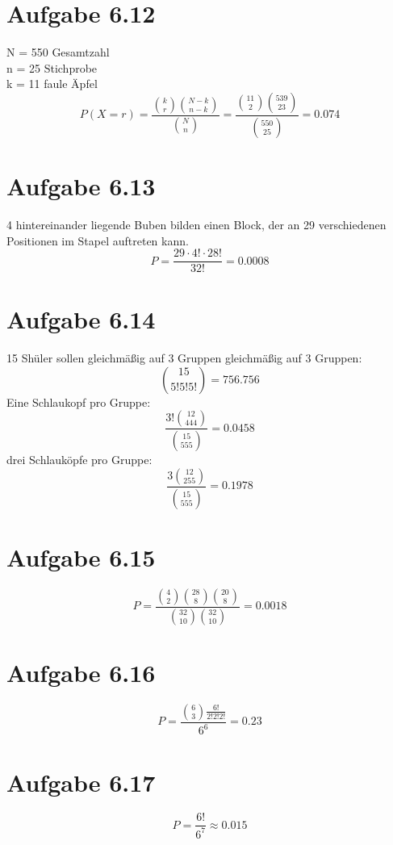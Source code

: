 \documentclass{article}
\begin{document}
	 \section*{Aufgabe 6.12}
	 N = 550 Gesamtzahl \\
	 n = 25 Stichprobe \\
	 k = 11 faule Äpfel \\
	 \newline
	 \[P(X = r) =  \frac{\binom{k}{r}\binom{N - k}{n-k}}{\binom{N}{n}} =  \frac{\binom{11}{2}\binom{539}{23}}{\binom{550}{25}} = 0.074\]
	 
	\section*{Aufgabe 6.13}
	4 hintereinander liegende Buben bilden einen Block, der an 29 verschiedenen Positionen im Stapel auftreten kann. \\
	\[P = \frac{29 \cdot 4! \cdot 28!}{32!} = 0.0008\]
	
	\section*{Aufgabe 6.14}
	15 Shüler sollen gleichmäßig auf 3 Gruppen gleichmäßig auf 3 Gruppen: \\
	 \[\binom{15}{5!5!5!} = 756.756\]
	Eine Schlaukopf pro Gruppe: \\
	\[\frac{3!\binom{12}{4 4 4}}{\binom{15}{5 5 5}} = 0.0458\]
	drei Schlauköpfe pro Gruppe: 
	\[\frac{3\binom{12}{2 5 5}}{\binom{15}{5 5 5}} = 0.1978\]
	
	\section*{Aufgabe 6.15}
	\[P = \frac{\binom{4}{2}\binom{28}{8}\binom{20}{8}}{\binom{32}{10}\binom{32}{10}} = 0.0018\]
	
	\section*{Aufgabe 6.16}
	\[P = \frac{\binom{6}{3}\frac{6!}{2!2!2!}}{6^6} = 0.23\]
	
	\section*{Aufgabe 6.17}
	
	\[P=\frac{6!}{6^7} \approx 0.015\]
	
\end{document}
